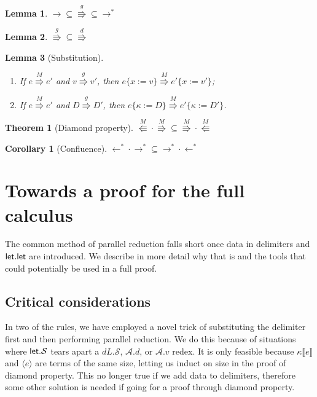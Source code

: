 \documentclass[a4paper, 11pt,titlepage, openright, twoside]{report}
\newcommand{\Par}[1]{\stackrel{#1}{\Rrightarrow}}
\newcommand{\Rap}[1]{\stackrel{#1}{\Lleftarrow}}
\newcommand{\keyword}[1]{\textsf{\textup{#1}}}
\newcommand{\KwLet}{\keyword{let}}
\newcommand{\subst}[2]{\{#1{:=}#2\}}
\renewcommand{\S}{\mathcal{S}}
\newcommand{\A}{\mathcal{A}}
\newcommand{\+}{\enspace}
\newtheorem{corollary}{Corollary}
\newtheorem{lemma}{Lemma}
\newtheorem{theorem}{Theorem}
\begin{document}
\begin{lemma}
	${→} ⊆ {\Par{g}} ⊆ {→^*}$
\end{lemma}

\begin{lemma}
	${\Par{g}} ⊆ {\Par{d}}$
\end{lemma}

\begin{lemma}[Substitution]
	\item
	\begin{enumerate}
		\item If $e \Par{M} e'$ and $v \Par{g} v'$, then $e\subst{x}{v} \Par{M} e'\subst{x}{v'}$;
		\item If $e \Par{M} e'$ and $D \Par{g} D'$, then $e\subst{κ}{D} \Par{M} e'\subst{κ}{D'}$.
	\end{enumerate}
\end{lemma}

\begin{theorem}[Diamond property]
	${\Rap{M} · \Par{M}} ⊆ {\Par{M} · \Rap{M}}$
\end{theorem}

\begin{corollary}[Confluence]
	${←^* · →^*} ⊆ {→^* · ←^*}$
\end{corollary}



\section{Towards a proof for the full calculus}
The common method of parallel reduction falls short
once data in delimiters and $\KwLet{}.\KwLet{}$ are introduced.
We describe in more detail why that is and the tools that could potentially be used in a full proof.

\subsection{Critical considerations}
\label{problet}

In two of the rules, we have employed a novel trick of substituting the delimiter first and then
performing parallel reduction.
We do this because of situations where $\KwLet{}.\S$ tears apart a $dL.\S$, $\A.d$, or $\A.v$ redex.
It is only feasible because $κ⟦e⟧$ and $⟨e⟩$ are terms of the same size,
letting us induct on size in the proof of diamond property.
This no longer true if we add data to delimiters, therefore some other solution is needed
if going for a proof through diamond property.
\end{document}
